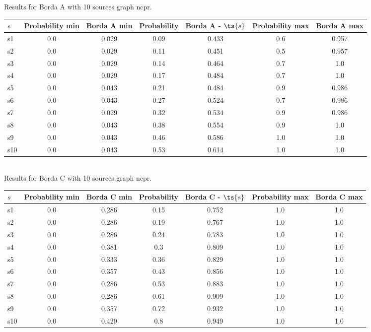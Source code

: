\documentclass{article}
\begin{document}
\noindent Results for Borda A with 10 sources graph ncpr.

\noindent\begin{tabular}{|l|c|c|c|c|c|c|}
\hline
$s$& Probability min & Borda A min & Probability & Borda A - $\ts{s}$ & Probability max & Borda A max\\
\hline
s1 &0.0 & 0.029 & 0.09 & 0.433 & 0.6 & 0.957\\
\hline
s2 &0.0 & 0.029 & 0.11 & 0.451 & 0.5 & 0.957\\
\hline
s3 &0.0 & 0.029 & 0.14 & 0.464 & 0.7 & 1.0\\
\hline
s4 &0.0 & 0.029 & 0.17 & 0.484 & 0.7 & 1.0\\
\hline
s5 &0.0 & 0.043 & 0.21 & 0.484 & 0.9 & 0.986\\
\hline
s6 &0.0 & 0.043 & 0.27 & 0.524 & 0.7 & 0.986\\
\hline
s7 &0.0 & 0.029 & 0.32 & 0.534 & 0.9 & 0.986\\
\hline
s8 &0.0 & 0.043 & 0.38 & 0.554 & 0.9 & 1.0\\
\hline
s9 &0.0 & 0.043 & 0.46 & 0.586 & 1.0 & 1.0\\
\hline
s10 &0.0 & 0.043 & 0.53 & 0.614 & 1.0 & 1.0\\
\hline
\end{tabular}\\

\noindent Results for Borda C with 10 sources graph ncpr.

\noindent\begin{tabular}{|l|c|c|c|c|c|c|}
\hline
$s$& Probability min & Borda C min & Probability & Borda C - $\ts{s}$ & Probability max & Borda C max\\
\hline
s1 &0.0 & 0.286 & 0.15 & 0.752 & 1.0 & 1.0\\
\hline
s2 &0.0 & 0.286 & 0.19 & 0.767 & 1.0 & 1.0\\
\hline
s3 &0.0 & 0.286 & 0.24 & 0.783 & 1.0 & 1.0\\
\hline
s4 &0.0 & 0.381 & 0.3 & 0.809 & 1.0 & 1.0\\
\hline
s5 &0.0 & 0.333 & 0.36 & 0.829 & 1.0 & 1.0\\
\hline
s6 &0.0 & 0.357 & 0.43 & 0.856 & 1.0 & 1.0\\
\hline
s7 &0.0 & 0.286 & 0.53 & 0.883 & 1.0 & 1.0\\
\hline
s8 &0.0 & 0.286 & 0.61 & 0.909 & 1.0 & 1.0\\
\hline
s9 &0.0 & 0.357 & 0.72 & 0.932 & 1.0 & 1.0\\
\hline
s10 &0.0 & 0.429 & 0.8 & 0.949 & 1.0 & 1.0\\
\hline
\end{tabular}\\
\end{document}
